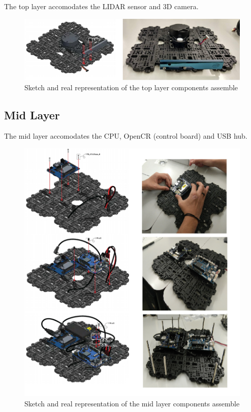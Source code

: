\documentclass{article}
\begin{document}
 The top layer accomodates the LIDAR sensor and 3D camera.
 
    \begin{figure}[h]
 \centering
 \includegraphics[width=1\textwidth,height=0.25\textheight]{toplayer.png}
 \caption{Sketch and real representation of the top layer components assemble}
 \end{figure}
 
 \newpage
 
 \subsection{Mid Layer}
 
 The mid layer accomodates the CPU, OpenCR (control board) and USB hub.
 
   \begin{figure}[h]
 \centering
 \includegraphics[width=1\textwidth]{midlayer.png}
 \caption{Sketch and real representation of the mid layer components assemble}
 \end{figure}
 
\end{document}
